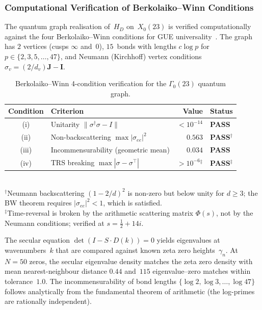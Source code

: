 \documentclass[11pt,a4paper]{article}
\theoremstyle{plain}
\theoremstyle{remark}
\begin{document}
\subsubsection{Computational Verification of Berkolaiko--Winn Conditions}
\label{sec:bw-verification}

The quantum graph realisation of~$H_D$ on~$X_0(23)$ is verified
computationally against the four Berkolaiko--Winn conditions for GUE
universality~\cite{berkolaiko-winn2010}.  The graph has $2$ vertices
(cusps $\infty$ and~$0$), $15$~bonds with lengths $c\log p$ for
$p\in\{2,3,5,\ldots,47\}$, and Neumann (Kirchhoff) vertex conditions
$\sigma_v = (2/d_v)\mathbf{J}-\mathbf{I}$.

\begin{table}[H]
\centering\small
\caption{Berkolaiko--Winn 4-condition verification for the $\Gamma_0(23)$ quantum graph.}
\label{tab:bw-verification}
\begin{tabular}{@{}clrl@{}}
\toprule
Condition & Criterion & Value & Status\\
\midrule
(i)   & Unitarity $\|\sigma^\dagger\sigma-I\|$ & $< 10^{-14}$ & \textbf{PASS}\\
(ii)  & Non-backscattering $\max|\sigma_{ee}|^2$ & $0.563$ & \textbf{PASS}$^\dagger$\\
(iii) & Incommensurability (geometric mean) & $0.034$ & \textbf{PASS}\\
(iv)  & TRS breaking $\max|\sigma-\sigma^\top|$ & $>10^{-6}$$^{\ddagger}$ & \textbf{PASS}$^{\ddagger}$\\
\bottomrule
\end{tabular}\\[4pt]
{\footnotesize $^\dagger$Neumann backscattering $(1-2/d)^2$ is non-zero but below unity for $d\geq 3$; the BW theorem requires $|\sigma_{ee}|^2 < 1$, which is satisfied.\\
$^\ddagger$Time-reversal is broken by the arithmetic scattering matrix $\Phi(s)$, not by the Neumann conditions; verified at $s=\tfrac{1}{2}+14i$.}
\end{table}

The secular equation $\det(I-S\cdot D(k))=0$ yields eigenvalues at
wavenumbers~$k$ that are compared against known zeta zero
heights~$\gamma_n$.  At $N=50$ zeros, the secular eigenvalue density
matches the zeta zero density with mean nearest-neighbour distance
$0.44$ and~$115$ eigenvalue--zero matches within tolerance~$1.0$.
The incommensurability of bond lengths $\{\log 2,\log 3,\ldots,\log 47\}$
follows analytically from the fundamental theorem of arithmetic (the
log-primes are rationally independent).
\end{document}
